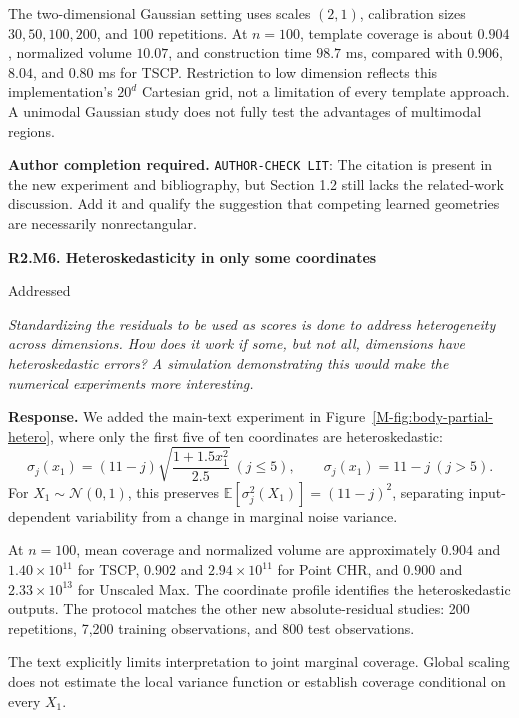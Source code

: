 \documentclass[11pt]{article}
\newcommand{\msfig}[1]{Figure~\ref*{M-#1}}
\newcommand{\action}[1]{\par{\small\color{ActionRed}\textbf{Author completion required.} #1\par}}
\newcommand{\point}[3]{\par\Needspace{7\baselineskip}\medskip
\noindent\parbox[t]{0.77\linewidth}{\textbf{#1}}\hfill
\parbox[t]{0.21\linewidth}{\raggedleft\small\sffamily #2}\par\nopagebreak
{\color{ReviewerBlue}\small\itshape #3\par}\textbf{Response.} }
\begin{document}
The two-dimensional Gaussian setting uses scales $(2,1)$, calibration sizes $30,50,100,200$, and 100 repetitions. At $n=100$, template coverage is about $0.904$, normalized volume $10.07$, and construction time $98.7$ ms, compared with $0.906$, $8.04$, and $0.80$ ms for TSCP. Restriction to low dimension reflects this implementation's $20^d$ Cartesian grid, not a limitation of every template approach. A unimodal Gaussian study does not fully test the advantages of multimodal regions.

\action{\texttt{AUTHOR-CHECK LIT}: The citation is present in the new experiment and bibliography, but Section 1.2 still lacks the related-work discussion. Add it and qualify the suggestion that competing learned geometries are necessarily nonrectangular.}

\point{R2.M6. Heteroskedasticity in only some coordinates}{Addressed}{Standardizing the residuals to be used as scores is done to address
heterogeneity across dimensions. How does it work if some, but not
all, dimensions have heteroskedastic errors? A simulation
demonstrating this would make the numerical experiments more
interesting.}
\label{response:R2.M6}
We added the main-text experiment in \msfig{fig:body-partial-hetero}, where only the first five of ten coordinates are heteroskedastic:
\[
 \sigma_j(x_1)=(11-j)\sqrt{\frac{1+1.5x_1^2}{2.5}}\ (j\leq5),
 \qquad \sigma_j(x_1)=11-j\ (j>5).
\]
For $X_1\sim\mathcal N(0,1)$, this preserves $\mathbb E[\sigma_j^2(X_1)]=(11-j)^2$, separating input-dependent variability from a change in marginal noise variance.

At $n=100$, mean coverage and normalized volume are approximately $0.904$ and $1.40\times10^{11}$ for TSCP, $0.902$ and $2.94\times10^{11}$ for Point CHR, and $0.900$ and $2.33\times10^{13}$ for Unscaled Max. The coordinate profile identifies the heteroskedastic outputs. The protocol matches the other new absolute-residual studies: 200 repetitions, 7,200 training observations, and 800 test observations.

The text explicitly limits interpretation to joint marginal coverage. Global scaling does not estimate the local variance function or establish coverage conditional on every $X_1$.
\end{document}

